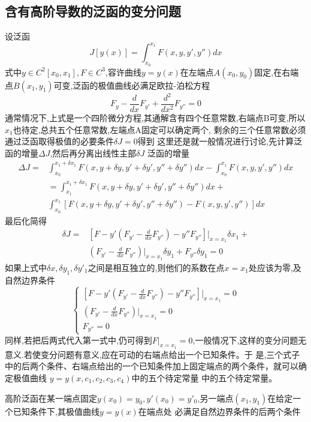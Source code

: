 \subsection{含有高阶导数的泛函的变分问题}
设泛函
\begin{equation}
 J[y(x)]=\int_{x_0}^{x_1}F(x,y,y',y'')dx
\end{equation}
式中$y \in C^2[x_0,x_1],F \in C^3$,容许曲线$y=y(x)$在左端点$A(x_0,y_0)$固定,在右端点$B(x_1,y_1)$可变,泛函的极值曲线必满足欧拉-泊松方程
$$F_y - \frac{d}{dx}F_{y'} + \frac{d^2}{dx^2}F_{y''}=0  $$
通常情况下,上式是一个四阶微分方程,其通解含有四个任意常数,右端点B可变,所以$x_1$也待定,总共五个任意常数,左端点A固定可以确定两个,
剩余的三个任意常数必须通过泛函取得极值的必要条件$\delta J=0$得到
这里还是就一般情况进行讨论,先计算泛函的增量$\Delta J$,然后再分离出线性主部$\delta J$
泛函的增量
\begin{equation}
 \begin{split}
 \Delta J = & \int_{x_0}^{x_1+\delta x_1}F(x,y+\delta y,y'+\delta y',y''+\delta y'')dx- \int_{x_0}^{x_1}F(x,y,y',y'')dx \\
              &  =\int_{x_1}^{x_1+\delta x_1}F(x,y+\delta y,y'+\delta y',y''+\delta y'')dx + \\
               & \int_{x_0}^{x_1}[F(x,y+\delta y,y'+\delta y',y''+\delta y'') -F(x,y,y',y'') ]dx
 \end{split}
\end{equation}
最后化简得
\begin{equation}
\begin{split}
 \delta J = & [F - y'(F_{y'}-\frac{d}{dx}F_{y''}) - y''F_{y''}]|_{x=x_1} \delta x_1 + \\
 & (F_{y'}-\frac{d}{dx}F_{y''})|_{x=x_1}\delta y_1 + F_{y''}\delta y_1 =0
\end{split}
\end{equation}
如果上式中$\delta x , \delta y_1, \delta y'_1$之间是相互独立的,则他们的系数在点$x=x_1$处应该为零,及自然边界条件
\begin{equation}
\left\{
  \begin{array}{ll}
[F - y'(F_{y'}-\frac{d}{dx}F_{y''}) - y''F_{y''}]|_{x=x_1}=0 \\
(F_{y'}-\frac{d}{dx}F_{y''})|_{x=x_1}=0\\
F_{y''}=0
  \end{array}
\right.
\end{equation}
同样,若把后两式代入第一式中,仍可得到$F|_{x=x_1}=0$,一般情况下,这样的变分问题无意义.若使变分问题有意义,应在可动的右端点给出一个已知条件。于
是,三个式子中的后两个条件、右端点给出的一个已知条件加上固定端点的两个条件，就可以确 定极值曲线
$y=y(x,c_1,c_2,c_3,c_4)$中的五个待定常量
中的五个待定常量。
\begin{theorem}
 高阶泛函在某一端点固定$y(x_0)=y_0,y'(x_0)=y'_0$,另一端点$(x_1,y_1)$在给定一个已知条件下,其极值曲线$y=y(x)$在端点处
必满足自然边界条件的后两个条件
\end{theorem}

